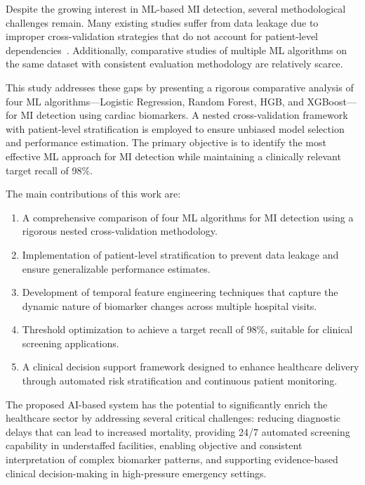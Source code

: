 \documentclass[fleqn,10pt,lineno]{wlpeerj}
\begin{document}
Despite the growing interest in ML-based MI detection, several methodological challenges remain. Many existing studies suffer from data leakage due to improper cross-validation strategies that do not account for patient-level dependencies~\citep{Varoquaux2022}. Additionally, comparative studies of multiple ML algorithms on the same dataset with consistent evaluation methodology are relatively scarce.

This study addresses these gaps by presenting a rigorous comparative analysis of four ML algorithms---Logistic Regression, Random Forest, HGB, and XGBoost---for MI detection using cardiac biomarkers. A nested cross-validation framework with patient-level stratification is employed to ensure unbiased model selection and performance estimation. The primary objective is to identify the most effective ML approach for MI detection while maintaining a clinically relevant target recall of 98\%.

The main contributions of this work are:
\begin{enumerate}[noitemsep]
\item A comprehensive comparison of four ML algorithms for MI detection using a rigorous nested cross-validation methodology.
\item Implementation of patient-level stratification to prevent data leakage and ensure generalizable performance estimates.
\item Development of temporal feature engineering techniques that capture the dynamic nature of biomarker changes across multiple hospital visits.
\item Threshold optimization to achieve a target recall of 98\%, suitable for clinical screening applications.
\item A clinical decision support framework designed to enhance healthcare delivery through automated risk stratification and continuous patient monitoring.
\end{enumerate}

The proposed AI-based system has the potential to significantly enrich the healthcare sector by addressing several critical challenges: reducing diagnostic delays that can lead to increased mortality, providing 24/7 automated screening capability in understaffed facilities, enabling objective and consistent interpretation of complex biomarker patterns, and supporting evidence-based clinical decision-making in high-pressure emergency settings.

\end{document}
